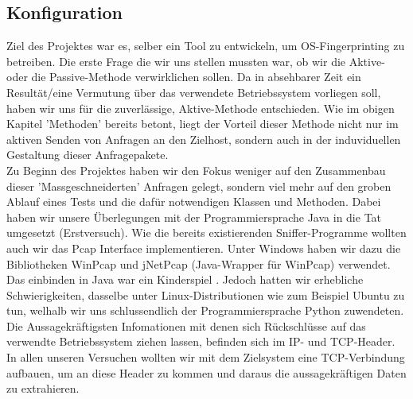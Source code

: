 \documentclass{article} %
\begin{document}
\subsection{Konfiguration}
Ziel des Projektes war es, selber ein Tool zu entwickeln, um OS-Fingerprinting zu betreiben. Die erste Frage die wir uns stellen mussten war, ob wir die Aktive- oder die Passive-Methode verwirklichen sollen. Da in absehbarer Zeit ein Resultät/eine Vermutung über das verwendete Betriebssystem vorliegen soll, haben wir uns für die zuverlässige, Aktive-Methode entschieden. Wie im obigen Kapitel 'Methoden' bereits betont, liegt der Vorteil dieser Methode nicht nur im aktiven Senden von Anfragen an den Zielhost, sondern auch in der induviduellen Gestaltung dieser Anfragepakete. \\
Zu Beginn des Projektes haben wir den Fokus weniger auf den Zusammenbau dieser 'Massgeschneiderten' Anfragen gelegt, sondern viel mehr auf den groben Ablauf eines Tests und die dafür notwendigen Klassen und Methoden. Dabei haben wir unsere Überlegungen mit der Programmiersprache Java in die Tat umgesetzt (Erstversuch). Wie die bereits existierenden Sniffer-Programme wollten auch wir das Pcap Interface implementieren. Unter Windows haben wir dazu die Bibliotheken WinPcap und jNetPcap (Java-Wrapper für WinPcap) verwendet. Das einbinden in Java war ein Kinderspiel \cite{jNetPcap-Tutorial}. Jedoch hatten wir erhebliche Schwierigkeiten, dasselbe unter Linux-Distributionen wie zum Beispiel Ubuntu zu tun, welhalb wir uns schlussendlich der Programmiersprache Python zuwendeten. Die Aussagekräftigsten Infomationen mit denen sich Rückschlüsse auf das verwendte Betriebssystem ziehen lassen, befinden sich im IP- und TCP-Header. In allen unseren Versuchen wollten wir  mit dem Zielsystem eine TCP-Verbindung aufbauen, um an diese Header zu kommen und daraus die aussagekräftigen Daten zu extrahieren.
\end{document}
